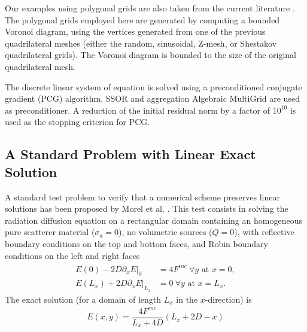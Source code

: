 \documentclass[preprint,10pt]{elsarticle}
\begin{document}
Our examples using polygonal grids are also taken from the current literature 
\cite{Kuznetsov2004,Brezzi2005,BaileyAdams2008}.
The polygonal grids employed here are generated by computing a bounded Voronoi diagram, using the 
vertices generated from one of the previous quadrilateral meshes (either the random, sinusoidal, Z-mesh, 
or Shestakov quadrilateral grids). The Voronoi diagram is bounded to the size of the original 
quadrilateral mesh.

The discrete linear system of equation is solved using a preconditioned conjugate gradient (PCG) algorithm. 
SSOR and aggregation Algebraic MultiGrid \cite{agmg}  are used as preconditioner. A reduction of the
initial residual norm by a factor of $10^{10}$ is used as the stopping criterion for PCG. 

\subsection{A Standard Problem with Linear Exact Solution} \label{sec:results_linear}
A standard test problem to verify that a numerical scheme preserves linear solutions has been
proposed by Morel et al. \cite{Morel1992}. This test consists
in solving the radiation diffusion equation on a rectangular domain containing an homogeneous pure 
scatterer material ($\sigma_a=0$), no volumetric sources ($Q=0$), with reflective boundary conditions 
on the top and bottom faces, and Robin boundary conditions on the left and right faces
\begin{align}
  E(0) - 2 D \left.\partial_x E\right|_0 &= 4F^{inc} \ \forall y \textrm{ at } x=0, \\
  E(L_x) + 2 D \left.\partial_x E\right|_{L_x} &= 0 \ \forall y \textrm{ at } x=L_x.
\end{align}
The exact solution (for a domain of length $L_x$ in the $x$-direction) is
\begin{equation}
E(x,y) = 	\frac{4F^{inc}}{L_x+4D}\left(L_x+2D-x \right)
\end{equation}
\end{document}
